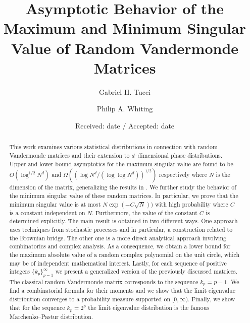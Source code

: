 \documentclass[smallextended]{svjour3}
\begin{document}
\title{Asymptotic Behavior of the Maximum and Minimum Singular Value of Random Vandermonde Matrices}


\author{Gabriel H. Tucci         \and
        Philip A. Whiting 
}


\date{Received: date / Accepted: date}

\maketitle

\begin{abstract}
This work examines various statistical distributions in connection with random Vandermonde matrices and their extension to $d$--dimensional phase distributions. Upper and lower bound asymptotics for the maximum singular value are found to be $O(\log^{1/2}{N^{d}})$ and $\Omega((\log N^{d} /(\log \log N^d))^{1/2})$ respectively where $N$ is the dimension of the matrix, generalizing the results in \cite{TW}. We further study the behavior of the minimum singular value of these random matrices. In particular, we prove that the minimum singular value is at most $N\exp(-C\sqrt{N}))$ with high probability where $C$ is a constant independent on $N$. Furthermore, the value of the constant $C$ is determined explicitly. The main result is obtained in two different ways. One approach uses techniques from stochastic processes and in particular, a construction related to the Brownian bridge. The other one is a more direct analytical approach involving combinatorics and complex analysis. As a consequence, we obtain a lower bound for the maximum absolute value of a random complex polynomial on the unit circle, which may be of independent mathematical interest. Lastly, for each sequence of positive integers $\{k_p\}_{p=1}^{\infty}$ we present a generalized version of the previously discussed matrices. The classical random Vandermonde matrix corresponds to the sequence $k_{p}=p-1$. We find a combinatorial formula for their moments and we show that the limit eigenvalue distribution converges to a probability measure supported on $[0,\infty)$. Finally, we show that for the sequence $k_p=2^{p}$ the limit eigenvalue distribution is the famous Marchenko--Pastur distribution. 
\end{abstract}
\end{document}
